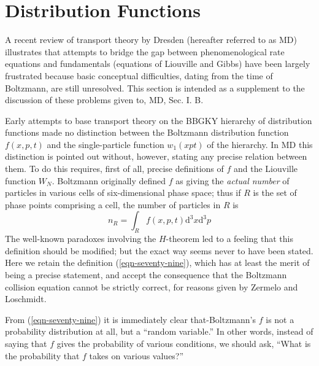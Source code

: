 \documentclass[]{article}
\begin{document}
\section{Distribution Functions}

A recent review of transport theory by Dresden\citep{Dresden-transport61} (hereafter referred to as MD) illustrates that attempts to bridge the gap between phenomenological rate equations and fundamentals (equations of Liouville and Gibbs) have been largely frustrated because basic conceptual difficulties, dating from the time of Boltzmann, are still unresolved. This section is intended as a supplement to the discussion of these problems given to, MD, Sec. I. B.

Early attempts to base transport theory on the BBGKY hierarchy of distribution functions made no distinction between the Boltzmann distribution function $f ( x , p , t )$ and the single-particle function $w_{1}(xpt)$ of the hierarchy. In MD this distinction is pointed out without, however, stating any precise relation between them. To do this requires, first of all, precise definitions of $f$ and the Liouville function $W_{N}$. Boltzmann originally defined $f$ as giving the \emph{actual number} of particles in various cells of six-dimensional phase space; thus if $R$ is the set of phase points comprising a cell, the number of particles in $R$ is 
\begin{equation}
n_{R}=\int_{R} f(x, p, t)\text{d}^{3} x\text{d}^{3} p \label{eqn-seventy-nine}
\end{equation}
The well-known paradoxes involving the $H$-theorem led to a feeling that this definition should be modified; but the exact way seems never to have been stated. Here we retain the definition (\ref{eqn-seventy-nine}), which has at least the merit of being a precise statement, and accept the consequence that the Boltzmann collision equation cannot be strictly correct, for reasons given by Zermelo and Loschmidt. 

From (\ref{eqn-seventy-nine}) it is immediately clear that-Boltzmann's $f$ is not a probability distribution at all, but a ``random variable.'' In other words, instead of saying that $f$ gives the probability of various conditions, we should ask, ``What is the probability that $f$ takes on various values?''
\end{document}
